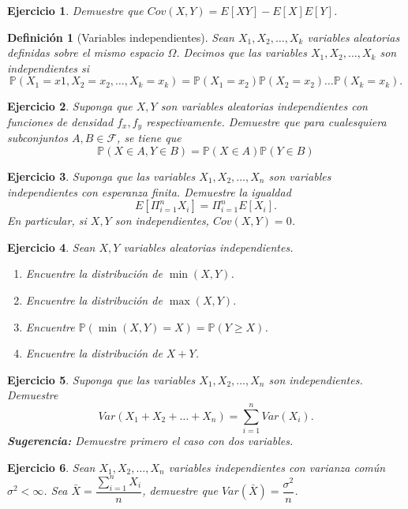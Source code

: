 \documentclass[11pt]{report}
\theoremstyle{break}
\newtheorem{definicion}{Definición}[chapter]
\newtheorem{ejercicio}{Ejercicio}[chapter]
\theoremstyle{break}
\begin{document}
\begin{ejercicio}
Demuestre que $Cov(X,Y) = E[XY] - E[X]E[Y]$.
\end{ejercicio}

\begin{definicion}[Variables independientes]
Sean $X_1, X_2,\ldots,X_k$ variables aleatorias definidas sobre el mismo espacio $\Omega$. Decimos que las variables $X_1, X_2,\ldots,X_k$ son independientes si
$$
\mathbb{P}(X_1 = x1, X_2 = x_2, \ldots, X_k = x_k) = \mathbb{P}(X_1 = x_2)\mathbb{P}(X_2 = x_2)\ldots\mathbb{P}(X_k = x_k).
$$
\end{definicion}

\begin{ejercicio}
Suponga que $X,Y$ son variables aleatorias independientes con funciones de densidad $f_x, f_y$ respectivamente. Demuestre que para cualesquiera subconjuntos $A,B \in \mathcal{F}$, se tiene que
$$
\mathbb{P}(X \in A, Y \in B) = \mathbb{P}(X \in A)\mathbb{P}(Y \in B)
$$
\end{ejercicio}

\begin{ejercicio}
Suponga que las variables $X_1, X_2, \ldots, X_n$ son variables independientes con esperanza finita. Demuestre la igualdad
$$
E[\Pi_{i=1}^{n}X_i] = \Pi_{i=1}^{n}E[X_i].
$$
En particular, si $X,Y$ son independientes, $Cov(X,Y) = 0$.
\end{ejercicio}

\begin{ejercicio}
Sean $X,Y$ variables aleatorias independientes.
\begin{enumerate}[label=\alph*)]
\item Encuentre la distribución de $\min(X,Y)$.
\item Encuentre la distribución de $\max(X,Y)$.
\item Encuentre $\mathbb{P}(\min(X,Y) = X) = \mathbb{P}(Y \geq X)$.
\item Encuentre la distribución de $X + Y$.
\end{enumerate}
\end{ejercicio}

\begin{ejercicio}
Suponga que las variables $X_1, X_2, \ldots, X_n$ son independientes. Demuestre
$$
Var(X_1 + X_2 + \ldots + X_n) = \sum_{i=1}^{n}Var(X_i).
$$
\textbf{Sugerencia:} Demuestre primero el caso con dos variables.
\end{ejercicio}

\begin{ejercicio}
Sean $X_1, X_2, \ldots, X_n$ variables independientes con varianza común $\sigma^2 < \infty$. Sea $\bar{X} = \dfrac{\sum_{i=1}^{n} X_i }{n}$, demuestre que $Var(\bar{X}) = \dfrac{\sigma^2}{n}$.
\end{ejercicio}
\end{document}
